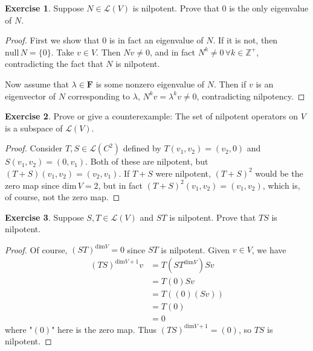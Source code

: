 \documentclass{article}
\theoremstyle{definition}
\newtheorem{ex}{Exercise}
\begin{document}
\begin{ex}
  Suppose $N \in \mathcal{L}(V)$ is nilpotent. Prove that 0 is the only eigenvalue of $N$.
\end{ex}
\begin{proof}
  First we show that 0 is in fact an eigenvalue of $N$.
  If it is not, then $\mathrm{null}\,N = \lbrace 0 \rbrace$.
  Take $v \in V$.
  Then $Nv \neq 0$, and in fact $N^k \neq 0\, \forall k \in \mathbb{Z}^+$, contradicting the fact that $N$ is nilpotent.

  Now assume that $\lambda \in \mathbf{F}$ is some nonzero eigenvalue of $N$.
  Then if $v$ is an eigenvector of $N$ corresponding to $\lambda$, $N^k v = \lambda ^k v \neq 0$, contradicting nilpotency.
\end{proof}

\begin{ex}
  Prove or give a counterexample: The set of nilpotent operators on $V$ is a subspace of $\mathcal{L}(V)$.
\end{ex}
\begin{proof}
  Consider $T, S \in \mathcal{L}(C^2)$ defined by $T(v_1, v_2) = (v_2, 0)$ and $S(v_1, v_2) = (0, v_1)$.
  Both of these are nilpotent, but $(T + S)(v_1, v_2) = (v_2, v_1)$.
  If $T + S$ were nilpotent, $(T + S)^2$ would be the zero map since $\mathrm{dim}\,V = 2$, but in fact $(T + S)^2(v_1, v_2) = (v_1, v_2)$, which is, of course, not the zero map.
\end{proof}

\begin{ex}
  Suppose $S, T \in \mathcal{L}(V)$ and $ST$ is nilpotent. Prove that $TS$ is nilpotent.
\end{ex}
\begin{proof}
  Of course, $(ST)^{\mathrm{dim}V} = 0$ since $ST$ is nilpotent.
  Given $v \in V$, we have \begin{align*}
    (TS)^{\mathrm{dim}V + 1}v &= T(ST^{\mathrm{dim}V})Sv\\
    &= T(0)Sv\\
    &= T((0)(Sv))\\
    &= T(0)\\
    &= 0
  \end{align*}
  where "$(0)$" here is the zero map.
  Thus $(TS)^{\mathrm{dim}V + 1} = (0)$, so $TS$ is nilpotent.
\end{proof}
\end{document}
